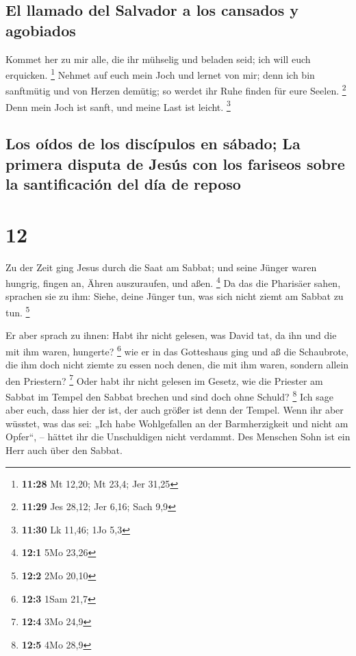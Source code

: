\hypertarget{el-llamado-del-salvador-a-los-cansados-y-agobiados}{%
\subsection{El llamado del Salvador a los cansados
\hspace{0pt}\hspace{0pt}y
agobiados}\label{el-llamado-del-salvador-a-los-cansados-y-agobiados}}

 Kommet her zu mir alle, die ihr mühselig und beladen
seid; ich will euch erquicken. \footnote{\textbf{11:28} Mt 12,20; Mt
  23,4; Jer 31,25}  Nehmet auf euch mein Joch und lernet
von mir; denn ich bin sanftmütig und von Herzen demütig; so werdet ihr
Ruhe finden für eure Seelen. \footnote{\textbf{11:29} Jes 28,12; Jer
  6,16; Sach 9,9}  Denn mein Joch ist sanft, und meine
Last ist leicht. \footnote{\textbf{11:30} Lk 11,46; 1Jo 5,3}

\hypertarget{los-ouxeddos-de-los-discuxedpulos-en-suxe1bado-la-primera-disputa-de-jesuxfas-con-los-fariseos-sobre-la-santificaciuxf3n-del-duxeda-de-reposo}{%
\subsection{Los oídos de los discípulos en sábado; La primera disputa de
Jesús con los fariseos sobre la santificación del día de
reposo}\label{los-ouxeddos-de-los-discuxedpulos-en-suxe1bado-la-primera-disputa-de-jesuxfas-con-los-fariseos-sobre-la-santificaciuxf3n-del-duxeda-de-reposo}}

\hypertarget{section-11}{%
\section{12}\label{section-11}}

 Zu der Zeit ging Jesus durch die Saat am Sabbat; und
seine Jünger waren hungrig, fingen an, Ähren auszuraufen, und aßen.
\footnote{\textbf{12:1} 5Mo 23,26}  Da das die Pharisäer
sahen, sprachen sie zu ihm: Siehe, deine Jünger tun, was sich nicht
ziemt am Sabbat zu tun. \footnote{\textbf{12:2} 2Mo 20,10}

 Er aber sprach zu ihnen: Habt ihr nicht gelesen, was
David tat, da ihn und die mit ihm waren, hungerte? \footnote{\textbf{12:3}
  1Sam 21,7}  wie er in das Gotteshaus ging und aß die
Schaubrote, die ihm doch nicht ziemte zu essen noch denen, die mit ihm
waren, sondern allein den Priestern? \footnote{\textbf{12:4} 3Mo 24,9}
 Oder habt ihr nicht gelesen im Gesetz, wie die Priester
am Sabbat im Tempel den Sabbat brechen und sind doch ohne Schuld?
\footnote{\textbf{12:5} 4Mo 28,9}  Ich sage aber euch,
dass hier der ist, der auch größer ist denn der Tempel. 
Wenn ihr aber wüsstet, was das sei: „Ich habe Wohlgefallen an der
Barmherzigkeit und nicht am Opfer``, -- hättet ihr die Unschuldigen
nicht verdammt.  Des Menschen Sohn ist ein Herr auch über
den Sabbat.

